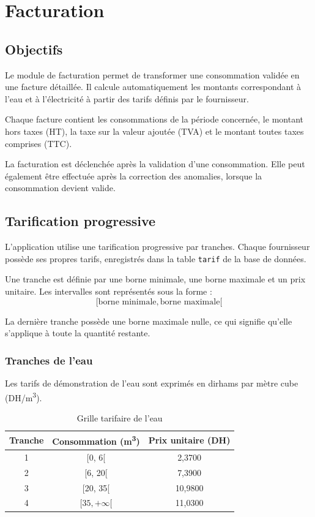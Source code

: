 
\chapter{Facturation}
\label{chap:facturation}

\section{Objectifs}

Le module de facturation permet de transformer une consommation validée en une facture détaillée. Il calcule automatiquement les montants correspondant à l'eau et à l'électricité à partir des tarifs définis par le fournisseur.

Chaque facture contient les consommations de la période concernée, le montant hors taxes (HT), la taxe sur la valeur ajoutée (TVA) et le montant toutes taxes comprises (TTC).

La facturation est déclenchée après la validation d'une consommation. Elle peut également être effectuée après la correction des anomalies, lorsque la consommation devient valide.

\section{Tarification progressive}

L'application utilise une tarification progressive par tranches. Chaque fournisseur possède ses propres tarifs, enregistrés dans la table \texttt{tarif} de la base de données.

Une tranche est définie par une borne minimale, une borne maximale et un prix unitaire. Les intervalles sont représentés sous la forme :
\[
[\text{borne minimale},\text{borne maximale}[
\]

La dernière tranche possède une borne maximale nulle, ce qui signifie qu'elle s'applique à toute la quantité restante.

\subsection{Tranches de l'eau}

Les tarifs de démonstration de l'eau sont exprimés en dirhams par mètre cube (DH/m\textsuperscript{3}).

\begin{table}[H]
\centering
\caption{Grille tarifaire de l'eau}
\begin{tabular}{ccc}
\toprule
\textbf{Tranche} & \textbf{Consommation (m\textsuperscript{3})} & \textbf{Prix unitaire (DH)} \\
\midrule
1 & [0, 6[ & 2,3700 \\
2 & [6, 20[ & 7,3900 \\
3 & [20, 35[ & 10,9800 \\
4 & $[35,+\infty[$ & 11,0300 \\
\bottomrule
\end{tabular}
\end{table}

